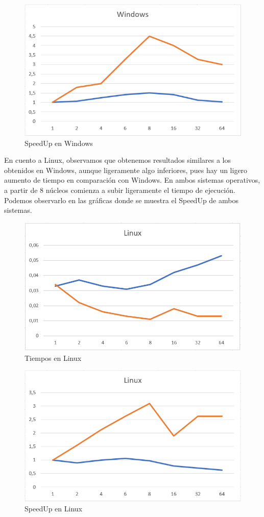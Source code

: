 \documentclass{article}
\begin{document}
\hfill\break
\begin{figure}[h]
\centering
\includegraphics[scale=0.7]{speed-up windows.png}
\caption{SpeedUp en Windows}
\end{figure}

En cuento a Linux, observamos que obtenemos resultados similares a los obtenidos en Windows, aunque ligeramente algo inferiores, pues hay un ligero aumento de tiempo en comparación con Windows. En ambos sistemas operativos, a partir de 8 núcleos comienza a subir ligeramente el tiempo de ejecución. Podemos observarlo en las gráficas donde se muestra el SpeedUp de ambos sistemas.

\hfill\break

\begin{figure}[h]
\centering
\includegraphics[scale=0.5]{linux.png}
\caption{Tiempos en Linux}
\end{figure}

\begin{figure}
\centering
\includegraphics[scale=0.7]{speed-up linux.png}
\caption{SpeedUp en Linux}
\end{figure}
\end{document}
